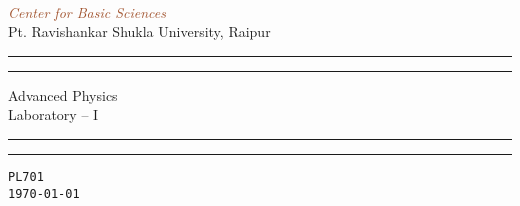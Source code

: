 \documentclass[a4paper, 11pt, oneside]{book} %
\begin{document}
 

\begin{titlepage} 
\centering %
\setlength{\unitlength}{0.6\textwidth} %
	
	{\color{LightGoldenrod}}\\[\baselineskip] %
	
	\textcolor{Sienna}{\textit{\Huge Center for Basic Sciences }}\\[\baselineskip] %
	
	{\color{RosyBrown}\Large  Pt. Ravishankar Shukla University, Raipur}\\ %
	
	{\color{LightGoldenrod}} %
	\centering %
	
	\scshape %
	
	\vspace*{7\baselineskip} %
	
	
	\rule{\textwidth}{1.6pt}\vspace*{-\baselineskip}\vspace*{2pt} %
	\rule{\textwidth}{0.4pt} %
	
	\vspace{0.75\baselineskip} %
	
	{\Huge Advanced Physics\\ Laboratory – I\\} %
	
	\vspace{0.75\baselineskip} %
	
	\rule{\textwidth}{0.4pt}\vspace*{-\baselineskip}\vspace{3.2pt} %
	\rule{\textwidth}{1.6pt} %
	
	\vspace{2\baselineskip} %
	
	\texttt{\LARGE PL701 \\ $~$\\ \today}
	

\end{titlepage}
\end{document}

